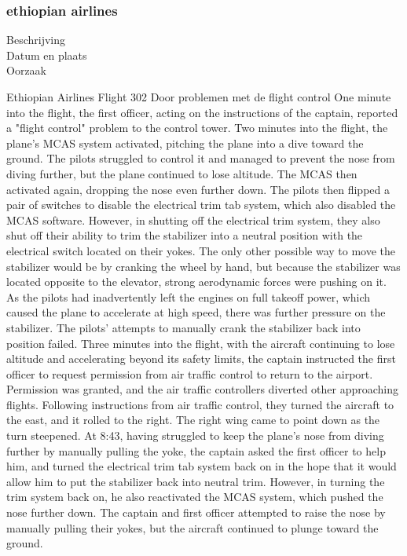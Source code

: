 \subsubsection{ethiopian airlines}

\begin{description}
\item[Beschrijving]
\item[Datum en plaats] 
\item[Oorzaak]
\end{description}
Ethiopian Airlines Flight 302
Door problemen met de flight control
One minute into the flight, the first officer, acting on the instructions of the captain, reported a "flight control" problem to the control tower.
Two minutes into the flight, the plane's MCAS system activated, pitching the plane into a dive toward the ground. The pilots struggled to control it and managed to prevent the nose from diving further, but the plane continued to lose altitude.
The MCAS then activated again, dropping the nose even further down. The pilots then flipped a pair of switches to disable the electrical trim tab system, which also disabled the MCAS software. However, in shutting off the electrical trim system, they also shut off their ability to trim the stabilizer into a neutral position with the electrical switch located on their yokes. The only other possible way to move the stabilizer would be by cranking the wheel by hand, but because the stabilizer was located opposite to the elevator, strong aerodynamic forces were pushing on it.
As the pilots had inadvertently left the engines on full takeoff power, which caused the plane to accelerate at high speed, there was further pressure on the stabilizer. The pilots' attempts to manually crank the stabilizer back into position failed.
Three minutes into the flight, with the aircraft continuing to lose altitude and accelerating beyond its safety limits, the captain instructed the first officer to request permission from air traffic control to return to the airport. Permission was granted, and the air traffic controllers diverted other approaching flights. Following instructions from air traffic control, they turned the aircraft to the east, and it rolled to the right. The right wing came to point down as the turn steepened.
At 8:43, having struggled to keep the plane's nose from diving further by manually pulling the yoke, the captain asked the first officer to help him, and turned the electrical trim tab system back on in the hope that it would allow him to put the stabilizer back into neutral trim. However, in turning the trim system back on, he also reactivated the MCAS system, which pushed the nose further down. The captain and first officer attempted to raise the nose by manually pulling their yokes, but the aircraft continued to plunge toward the ground.

